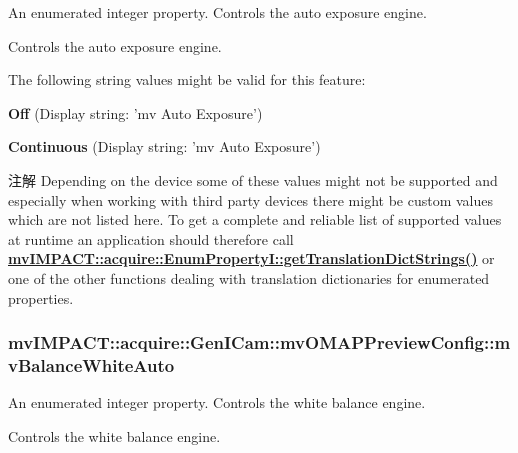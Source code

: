 An enumerated integer property. Controls the auto exposure engine. 

Controls the auto exposure engine.

The following string values might be valid for this feature\+:
\begin{DoxyItemize}
\item {\bfseries Off} (Display string\+: 'mv Auto Exposure')
\item {\bfseries Continuous} (Display string\+: 'mv Auto Exposure')
\end{DoxyItemize}

\begin{DoxyNote}{注解}
Depending on the device some of these values might not be supported and especially when working with third party devices there might be custom values which are not listed here. To get a complete and reliable list of supported values at runtime an application should therefore call {\bfseries \hyperlink{classmv_i_m_p_a_c_t_1_1acquire_1_1_enum_property_i_a0ba6ccbf5ee69784d5d0b537924d26b6}{mv\+I\+M\+P\+A\+C\+T\+::acquire\+::\+Enum\+Property\+I\+::get\+Translation\+Dict\+Strings()}} or one of the other functions dealing with translation dictionaries for enumerated properties. 
\end{DoxyNote}
\hypertarget{classmv_i_m_p_a_c_t_1_1acquire_1_1_gen_i_cam_1_1mv_o_m_a_p_preview_config_a3bb2b67fcd204b7ea2d164a3d6fb2013}{
\subsubsection[{mv\+Balance\+White\+Auto}]{ mv\+I\+M\+P\+A\+C\+T\+::acquire\+::\+Gen\+I\+Cam\+::mv\+O\+M\+A\+P\+Preview\+Config\+::mv\+Balance\+White\+Auto}}\label{classmv_i_m_p_a_c_t_1_1acquire_1_1_gen_i_cam_1_1mv_o_m_a_p_preview_config_a3bb2b67fcd204b7ea2d164a3d6fb2013}


An enumerated integer property. Controls the white balance engine. 

Controls the white balance engine.


